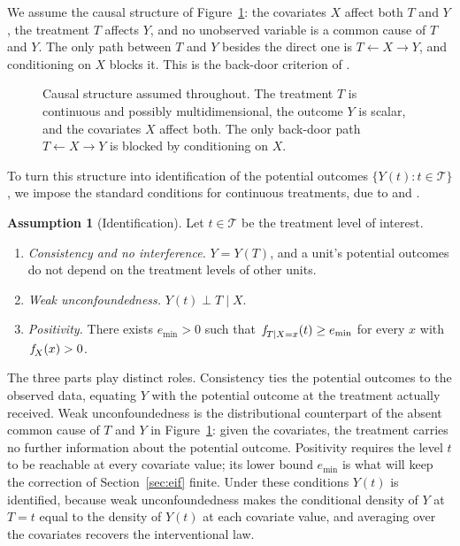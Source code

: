\documentclass[11pt]{article}
\theoremstyle{plain}
\theoremstyle{definition}
\newtheorem{assumption}{Assumption}
\theoremstyle{remark}
\newcommand{\cT}{\ensuremath{\mathcal{T}}}
\newcommand{\pf}[1]{\ensuremath{\,\mathlarger{\textit{f}}_{#1}}}
\newcommand{\gps}{e}
\begin{document}
We assume the causal structure of Figure~\ref{fig:dag}: the covariates $X$ affect both $T$
and $Y$, the treatment $T$ affects $Y$, and no unobserved variable is a common cause of $T$
and $Y$. The only path between $T$ and $Y$ besides the direct one is
$T \leftarrow X \rightarrow Y$, and conditioning on $X$ blocks it. This is the back-door
criterion of \citet{pearl2009}.

\begin{figure}[htbp]
    \centering
    \caption{Causal structure assumed throughout. The treatment $T$ is continuous and
    possibly multidimensional, the outcome $Y$ is scalar, and the covariates $X$ affect
    both. The only back-door path $T \leftarrow X \rightarrow Y$ is blocked by conditioning
    on $X$.}
    \label{fig:dag}
\end{figure}

To turn this structure into identification of the potential outcomes
$\{Y(t) : t \in \cT\}$, we impose the standard conditions for continuous treatments, due to
\citet{imbens2000} and \citet{hirano2004}.

\begin{assumption}[Identification]
\label{as:identification}
Let $t \in \cT$ be the treatment level of interest.
\begin{enumerate}
\item[(i)] \emph{Consistency and no interference.} $Y = Y(T)$, and a unit's potential
outcomes do not depend on the treatment levels of other units.
\item[(ii)] \emph{Weak unconfoundedness.} $Y(t) \perp T \mid X$.
\item[(iii)] \emph{Positivity.} There exists $\gps_{\min} > 0$ such that
$\pf{T \mid X=x}(t) \ge \gps_{\min}$ for every $x$ with $\pf{X}(x) > 0$.
\end{enumerate}
\end{assumption}

The three parts play distinct roles. Consistency ties the potential outcomes to the observed
data, equating $Y$ with the potential outcome at the treatment actually received. Weak
unconfoundedness is the distributional counterpart of the absent common cause of $T$ and $Y$
in Figure~\ref{fig:dag}: given the covariates, the treatment carries no further information
about the potential outcome. Positivity requires the level $t$ to be reachable at every
covariate value; its lower bound $\gps_{\min}$ is what will keep the correction of
Section~\ref{sec:eif} finite. Under these conditions $Y(t)$ is identified, because weak
unconfoundedness makes the conditional density of $Y$ at $T=t$ equal to the density of $Y(t)$
at each covariate value, and averaging over the covariates recovers the interventional law.
\end{document}
